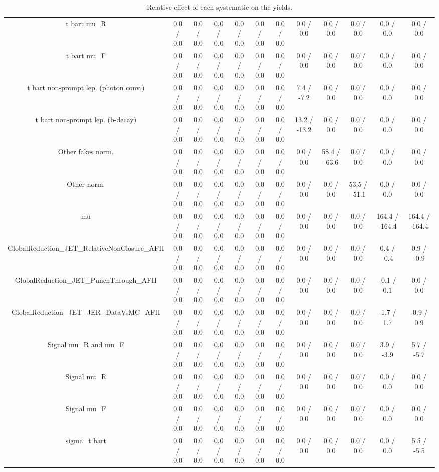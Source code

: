 \begin{table}[htbp]
\begin{center}
\begin{tabular}{|c|c|c|c|c|c|c|c|c|c|c|c|}
  t bar{t}  mu_{R} & 0.0 / 0.0 & 0.0 / 0.0 & 0.0 / 0.0 & 0.0 / 0.0 & 0.0 / 0.0 & 0.0 / 0.0 & 0.0 / 0.0 & 0.0 / 0.0 & 0.0 / 0.0 & 0.0 / 0.0 & 0.0 / 0.0 \\ 
  t bar{t}  mu_{F} & 0.0 / 0.0 & 0.0 / 0.0 & 0.0 / 0.0 & 0.0 / 0.0 & 0.0 / 0.0 & 0.0 / 0.0 & 0.0 / 0.0 & 0.0 / 0.0 & 0.0 / 0.0 & 0.0 / 0.0 & 0.0 / 0.0 \\ 
  t bar{t} non-prompt lep. (photon conv.) & 0.0 / 0.0 & 0.0 / 0.0 & 0.0 / 0.0 & 0.0 / 0.0 & 0.0 / 0.0 & 0.0 / 0.0 & 7.4 / -7.2 & 0.0 / 0.0 & 0.0 / 0.0 & 0.0 / 0.0 & 0.0 / 0.0 \\ 
  t bar{t} non-prompt lep. (b-decay) & 0.0 / 0.0 & 0.0 / 0.0 & 0.0 / 0.0 & 0.0 / 0.0 & 0.0 / 0.0 & 0.0 / 0.0 & 13.2 / -13.2 & 0.0 / 0.0 & 0.0 / 0.0 & 0.0 / 0.0 & 0.0 / 0.0 \\ 
  Other fakes norm. & 0.0 / 0.0 & 0.0 / 0.0 & 0.0 / 0.0 & 0.0 / 0.0 & 0.0 / 0.0 & 0.0 / 0.0 & 0.0 / 0.0 & 58.4 / -63.6 & 0.0 / 0.0 & 0.0 / 0.0 & 0.0 / 0.0 \\ 
  Other norm. & 0.0 / 0.0 & 0.0 / 0.0 & 0.0 / 0.0 & 0.0 / 0.0 & 0.0 / 0.0 & 0.0 / 0.0 & 0.0 / 0.0 & 0.0 / 0.0 & 53.5 / -51.1 & 0.0 / 0.0 & 0.0 / 0.0 \\ 
  mu & 0.0 / 0.0 & 0.0 / 0.0 & 0.0 / 0.0 & 0.0 / 0.0 & 0.0 / 0.0 & 0.0 / 0.0 & 0.0 / 0.0 & 0.0 / 0.0 & 0.0 / 0.0 & 164.4 / -164.4 & 164.4 / -164.4 \\ 
  GlobalReduction_JET_RelativeNonClosure_AFII & 0.0 / 0.0 & 0.0 / 0.0 & 0.0 / 0.0 & 0.0 / 0.0 & 0.0 / 0.0 & 0.0 / 0.0 & 0.0 / 0.0 & 0.0 / 0.0 & 0.0 / 0.0 & 0.4 / -0.4 & 0.9 / -0.9 \\ 
  GlobalReduction_JET_PunchThrough_AFII & 0.0 / 0.0 & 0.0 / 0.0 & 0.0 / 0.0 & 0.0 / 0.0 & 0.0 / 0.0 & 0.0 / 0.0 & 0.0 / 0.0 & 0.0 / 0.0 & 0.0 / 0.0 & -0.1 / 0.1 & 0.0 / 0.0 \\ 
  GlobalReduction_JET_JER_DataVsMC_AFII & 0.0 / 0.0 & 0.0 / 0.0 & 0.0 / 0.0 & 0.0 / 0.0 & 0.0 / 0.0 & 0.0 / 0.0 & 0.0 / 0.0 & 0.0 / 0.0 & 0.0 / 0.0 & -1.7 / 1.7 & -0.9 / 0.9 \\ 
  Signal  mu_{R} and  mu_{F} & 0.0 / 0.0 & 0.0 / 0.0 & 0.0 / 0.0 & 0.0 / 0.0 & 0.0 / 0.0 & 0.0 / 0.0 & 0.0 / 0.0 & 0.0 / 0.0 & 0.0 / 0.0 & 3.9 / -3.9 & 5.7 / -5.7 \\ 
  Signal  mu_{R} & 0.0 / 0.0 & 0.0 / 0.0 & 0.0 / 0.0 & 0.0 / 0.0 & 0.0 / 0.0 & 0.0 / 0.0 & 0.0 / 0.0 & 0.0 / 0.0 & 0.0 / 0.0 & 0.0 / 0.0 & 0.0 / 0.0 \\ 
  Signal  mu_{F} & 0.0 / 0.0 & 0.0 / 0.0 & 0.0 / 0.0 & 0.0 / 0.0 & 0.0 / 0.0 & 0.0 / 0.0 & 0.0 / 0.0 & 0.0 / 0.0 & 0.0 / 0.0 & 0.0 / 0.0 & 0.0 / 0.0 \\ 
   sigma_{t bar{t}} & 0.0 / 0.0 & 0.0 / 0.0 & 0.0 / 0.0 & 0.0 / 0.0 & 0.0 / 0.0 & 0.0 / 0.0 & 0.0 / 0.0 & 0.0 / 0.0 & 0.0 / 0.0 & 0.0 / 0.0 & 5.5 / -5.5 \\ 
\hline 
\end{tabular} 
\caption{Relative effect of each systematic on the yields.} 
\end{center} 
\end{table} 
